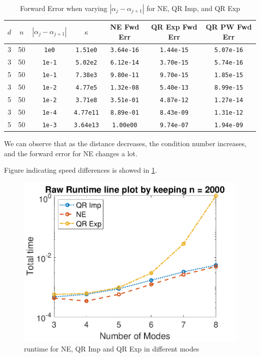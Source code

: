\documentclass{article}
\begin{document}
\begin{table}[ht!] 
  \centering
  \begin{tabular}{|c|c|c|c|c|c|c|}
    \hline
    $d$ & $n$ & $|\alpha_j-\alpha_{j+1}|$ & $\kappa$ & NE Fwd Err & QR Exp Fwd Err & QR PW Fwd Err \\
    \hline
    3 & 50 & \texttt{1e0}  & \texttt{1.51e0}  & \texttt{3.64e-16} & \texttt{1.44e-15} & \texttt{5.07e-16} \\
    3 & 50 & \texttt{1e-1} & \texttt{5.02e2}  & \texttt{6.12e-14} & \texttt{3.70e-15} & \texttt{5.74e-16} \\
    5 & 50 & \texttt{1e-1} & \texttt{7.38e3}  & \texttt{9.80e-11} & \texttt{9.70e-15} & \texttt{1.85e-15}\\
    3 & 50 & \texttt{1e-2} & \texttt{4.77e5}  & \texttt{1.32e-08} & \texttt{5.40e-13} & \texttt{8.99e-15} \\
    5 & 50 & \texttt{1e-2} & \texttt{3.71e8}  & \texttt{3.51e-01} & \texttt{4.87e-12} & \texttt{1.27e-14}\\
    3 & 50 & \texttt{1e-4} & \texttt{4.77e11} & \texttt{8.89e-01} & \texttt{8.43e-09} & \texttt{1.31e-12} \\
    5 & 50 & \texttt{1e-3} & \texttt{3.64e13} & \texttt{1.00e00}  & \texttt{9.74e-07} & \texttt{1.94e-09}\\
    \hline
  \end{tabular}
  \caption{Forward Error when varying $|\alpha_j-\alpha_{j+1}|$ for NE, QR Imp, and QR Exp}
  \label{tab:LS_err}
\end{table}
We can observe that as the distance decreases, the condition number increases, and the forward error for NE changes a lot.

Figure indicating speed differences is showed in \cref{fig:LS_problem_line}.
\begin{figure}[ht!]
  \begin{center}
    \includegraphics[scale = 0.7]{lineplot_p.pdf}
    \caption[Figure]{runtime for NE, QR Imp and QR Exp in different modes \label{fig:LS_problem_line}}
  \end{center}
\end{figure}
\end{document}
